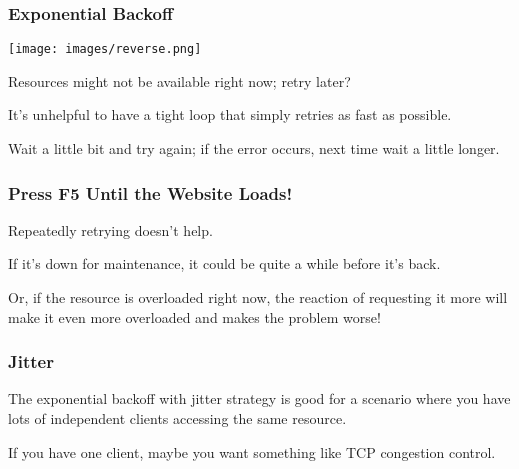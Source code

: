 \begin{frame}
\frametitle{Exponential Backoff}


\begin{center}
	\texttt{[image: images/reverse.png]}
\end{center}

Resources might not be available right now; retry later?

It's unhelpful to have a tight loop that simply retries as fast as possible. 

Wait a little bit and try again; if the error occurs, next time wait a little longer.

\end{frame}

\begin{frame}
\frametitle{Press F5 Until the Website Loads!}

Repeatedly retrying doesn't help. 

If it's down for maintenance, it could be quite a while before it's back.

Or, if the resource is overloaded right now, the reaction of requesting it more will make it even more overloaded and makes the problem worse! 


\end{frame}

\begin{frame}
\frametitle{Jitter}


The exponential backoff with jitter strategy is good for a scenario where you have lots of independent clients accessing the same resource.

If you have one client, maybe you want something like TCP congestion control.

\end{frame}







